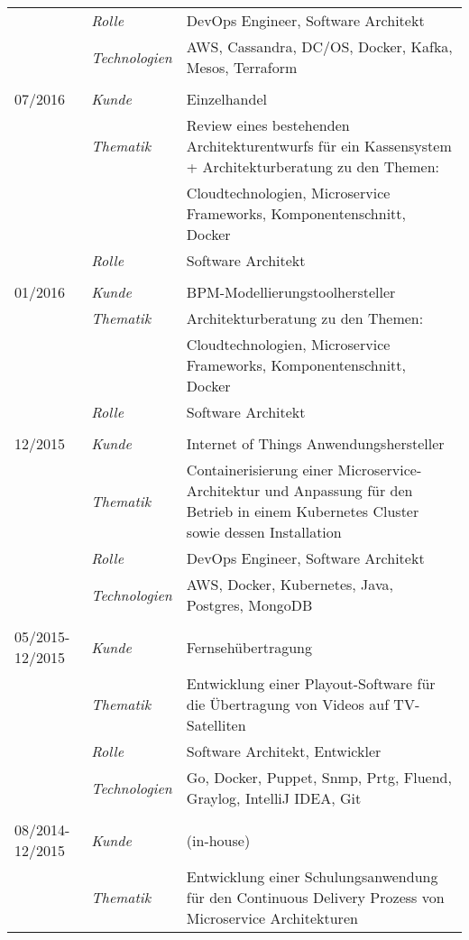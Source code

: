 \begin{longtable}{@{}>{}p{4cm}>{\itshape}p{2cm}>{}p{9cm}}
\nopagebreak		& Rolle 	    & DevOps Engineer, Software Architekt\\
\nopagebreak		& Technologien	& AWS, Cassandra, DC/OS, Docker, Kafka, Mesos, Terraform\\
\\
07/2016             & Kunde 	    & Einzelhandel\\
\nopagebreak		& Thematik	    & Review eines bestehenden Architekturentwurfs für ein Kassensystem + Architekturberatung zu den Themen:\\
\nopagebreak		&           	& Cloudtechnologien, Microservice Frameworks, Komponentenschnitt, Docker\\
\nopagebreak		& Rolle 	    & Software Architekt\\
\\
01/2016             & Kunde 	    & BPM-Modellierungstoolhersteller\\
\nopagebreak		& Thematik	    & Architekturberatung zu den Themen:\\
\nopagebreak		&           	& Cloudtechnologien, Microservice Frameworks, Komponentenschnitt, Docker\\
\nopagebreak		& Rolle 	    & Software Architekt\\
\\
12/2015             & Kunde 	    & Internet of Things Anwendungshersteller\\
\nopagebreak		& Thematik	    & Containerisierung einer Microservice-Architektur und Anpassung für den Betrieb in einem Kubernetes Cluster sowie dessen Installation\\
\nopagebreak		& Rolle 	    & DevOps Engineer, Software Architekt\\
\nopagebreak		& Technologien	& AWS, Docker, Kubernetes, Java, Postgres, MongoDB\\
\\
05/2015-12/2015     & Kunde 	    & Fernsehübertragung\\
\nopagebreak		& Thematik	    & Entwicklung einer Playout-Software für die Übertragung von Videos auf TV-Satelliten\\
\nopagebreak		& Rolle 	    & Software Architekt, Entwickler\\
\nopagebreak		& Technologien	& Go, Docker, Puppet, Snmp, Prtg, Fluend, Graylog, IntelliJ IDEA, Git\\
\\
08/2014-12/2015     & Kunde 	    & (in-house)\\
\nopagebreak		& Thematik	    & Entwicklung einer Schulungsanwendung für den Continuous Delivery Prozess von Microservice Architekturen\\

\end{longtable}
